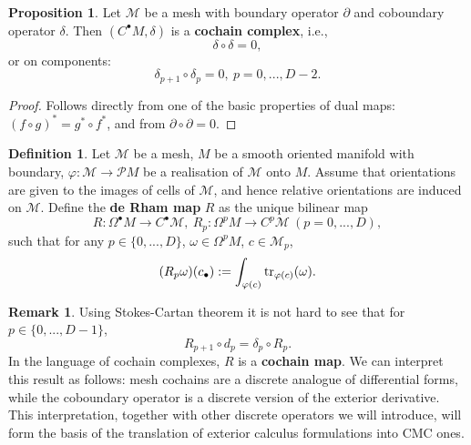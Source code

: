 \documentclass{elsarticle}
\theoremstyle{definition}
\newtheorem{proposition}[theorem]{Proposition}
\newtheorem{definition}[theorem]{Definition}
\newtheorem{remark}[theorem]{Remark}
\newcommand{\tr}{\mathop{\rm tr}\nolimits}
\newcommand{\newterm}[1]{\textbf{#1}}
\begin{document}
\begin{proposition}
  Let $\mathcal{M}$ be a mesh with boundary operator $\partial$ and coboundary operator $\delta$.
  Then $(C^\bullet M, \delta)$ is a \newterm{cochain complex}, i.e.,
  \begin{equation}
    \delta \circ \delta = 0,
  \end{equation}
  or on components:
  \begin{equation}
    \delta_{p + 1} \circ \delta_p = 0,\ p = 0, ..., D - 2.
  \end{equation}
\end{proposition}
\begin{proof}
  Follows directly from one of the basic properties of dual maps:
  $(f \circ g)^* = g^* \circ f^*$,
  and from $\partial \circ \partial = 0$.
\end{proof}
\begin{definition}
  Let $\mathcal{M}$ be a mesh,
  $M$ be a smooth oriented manifold with boundary,
  $\varphi \colon \mathcal{M} \to \mathcal{P} M$ be a realisation of $\mathcal{M}$ onto $M$.
  Assume that orientations are given to the images of cells of $\mathcal{M}$, and hence relative orientations are induced on $\mathcal{M}$.
  Define the \newterm{de Rham map} $R$ as the unique bilinear map
  \begin{equation}
    R \colon \Omega^\bullet M \to C^\bullet \mathcal{M},\
    R_p \colon \Omega^p M \to C^p \mathcal{M}\ (p = 0, ..., D),
  \end{equation}
  such that for any $p \in \{0, ..., D\}$, $\omega \in \Omega^p M$, $c \in \mathcal{M}_p$,
  \begin{equation}
    (R_p \omega)(c_\bullet) := \int_{\varphi(c)} \tr_{\varphi(c)}(\omega).
  \end{equation}
\end{definition}
\begin{remark}
  Using Stokes-Cartan theorem it is not hard to see that for $p \in \{0, ..., D - 1\}$,
  \begin{equation}
    R_{p + 1} \circ d_p = \delta_p \circ R_p.
  \end{equation}
  In the language of cochain complexes, $R$ is a \newterm{cochain map}.
  We can interpret this result as follows: mesh cochains are a discrete analogue of differential forms, while the coboundary operator is a discrete version of the exterior derivative.
  This interpretation, together with other discrete operators we will introduce, will form the basis of the translation of exterior calculus formulations into CMC ones.
\end{remark}
\end{document}
